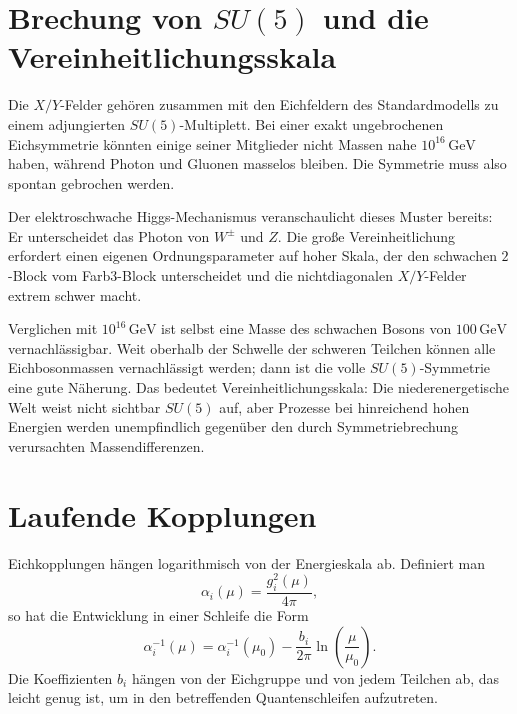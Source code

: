 \section{Brechung von \texorpdfstring{\(SU(5)\)}{SU(5)} und die Vereinheitlichungsskala}

Die \(X/Y\)-Felder gehören zusammen mit den Eichfeldern des Standardmodells zu einem adjungierten \(SU(5)\)-Multiplett. Bei einer exakt ungebrochenen Eichsymmetrie könnten einige seiner Mitglieder nicht Massen nahe \(10^{16}\,\mathrm{GeV}\) haben, während Photon und Gluonen masselos bleiben. Die Symmetrie muss also spontan gebrochen werden.

\begin{classroomqa}
\end{classroomqa}

Der elektroschwache Higgs-Mechanismus veranschaulicht dieses Muster bereits: Er unterscheidet das Photon von \(W^\pm\) und \(Z\). Die große Vereinheitlichung erfordert einen eigenen Ordnungsparameter auf hoher Skala, der den schwachen \(2\)-Block vom Farb\(3\)-Block unterscheidet und die nichtdiagonalen \(X/Y\)-Felder extrem schwer macht.

Verglichen mit \(10^{16}\,\mathrm{GeV}\) ist selbst eine Masse des schwachen Bosons von \(100\,\mathrm{GeV}\) vernachlässigbar. Weit oberhalb der Schwelle der schweren Teilchen können alle Eichbosonmassen vernachlässigt werden; dann ist die volle \(SU(5)\)-Symmetrie eine gute Näherung. Das bedeutet Vereinheitlichungsskala: Die niederenergetische Welt weist nicht sichtbar \(SU(5)\) auf, aber Prozesse bei hinreichend hohen Energien werden unempfindlich gegenüber den durch Symmetriebrechung verursachten Massendifferenzen.

\section{Laufende Kopplungen}

Eichkopplungen hängen logarithmisch von der Energieskala ab. Definiert man
\begin{equation}
\alpha_i(\mu)=\frac{g_i^2(\mu)}{4\pi},
\end{equation}
so hat die Entwicklung in einer Schleife die Form
\begin{equation}
\alpha_i^{-1}(\mu)
=
\alpha_i^{-1}(\mu_0)
-\frac{b_i}{2\pi}
\ln\!\left(\frac{\mu}{\mu_0}\right).
\label{eq:l10-running}
\end{equation}
Die Koeffizienten \(b_i\) hängen von der Eichgruppe und von jedem Teilchen ab, das leicht genug ist, um in den betreffenden Quantenschleifen aufzutreten.

